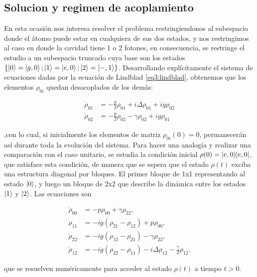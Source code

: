 \subsection{Solucion y regimen de acoplamiento}\label{sec3:regimen acoplamiento}
En esta ocasión nos interesa resolver el problema restringiendonos al subespacio donde el átomo puede estar en cualquiera de sus dos estados, y nos restringimos al caso en donde la cavidad tiene 1 o 2 fotones, en consecuencia, se restringe el estudio a un subespacio truncado cuya base son los estados $\{ \ket{0}=\ket{g,0} ; \ket{1}=\ket{e,0} ; \ket{2}=\ket{-,1} \}$. Desarrollando explícitamente el sistema de ecuaciones dadas por la ecuación de Lindblad \ref{eq3:lindblad}, obtenemos que los elementos $\rho_{0i}$ quedan desacoplados de los demás:

\begin{equation}
    \begin{aligned}
        \dot \rho_{01} & =-\frac{p}{2} \rho_{01}+i\Delta\rho_{01}+ig\rho_{02} \\
        \dot \rho_{02} & =-\frac{p}{2} \rho_{02}-\gamma \rho_{02}+ig\rho_{01}
    \end{aligned}
\end{equation}

,con lo cual, si inicialmente los elementos de matriz $\rho_{0i}(0)=0$, permanecerán así durante toda la evolución del sistema. Para hacer una analogía y realizar una comparación con el caso unitario, se estudia la condición inicial $\rho(0)=\ketbra{e,0}{e,0}$, que satisface esta condición, de manera que se espera que el estado $\rho(t)$ exciba una estructura diagonal por bloques. El primer bloque de 1x1 representando al estado $\ket{0}$, y luego un bloque de 2x2 que describe la dinámica entre los estados $\ket{1}$ y $\ket{2}$. Las ecuaciones son

\begin{equation}
\begin{aligned}
\dot{\rho}_{00} &= -p \rho_{00} + \gamma \rho_{22}, \\
\dot{\rho}_{11} &= -i g (\rho_{21} - \rho_{12}) + p \rho_{00}, \\
\dot{\rho}_{22} &= -i g (\rho_{12} - \rho_{21}) - \gamma \rho_{22}, \\
\dot{\rho}_{12} &= -i g (\rho_{22} - \rho_{11}) - i \Delta \rho_{12} - \frac{\gamma}{2} \rho_{12}.
\end{aligned}
\end{equation}

que se resuelven numéricamente para acceder al estado $\rho(t)$ a tiempo $t>0$. 


